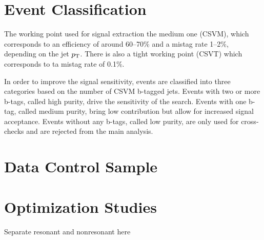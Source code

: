 \section{Event Classification\label{sec:classification}}
 The working point used for signal extraction the medium one (CSVM),
which corresponds to an efficiency of around 60--70\%
and a mistag rate 1--2\%, depending on the jet $p_{\rm T}$.
There is also a tight working point (CSVT) which corresponds to ta mistag rate of 0.1\%.

In order to improve the signal sensitivity, events are classified into three categories
based on the number of CSVM b-tagged jets. Events with two or more b-tags, called high purity,
drive the sensitivity of the search. Events with one b-tag, called medium purity,
bring low contribution but allow for increased signal acceptance. Events without any b-tags,
called low purity, are only used for cross-checks and are rejected from the main analysis.


\section{Data Control Sample\label{sec:dataCS}}

\section{Optimization Studies\label{sec:optim}}
Separate resonant and nonresonant here



